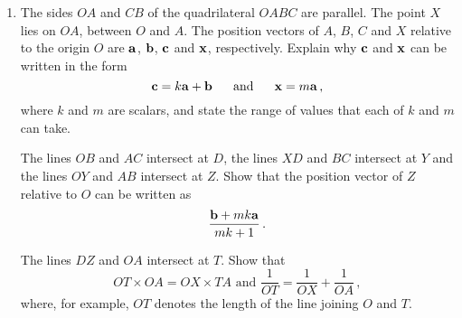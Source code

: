 \documentclass[a4, 11pt]{report}
\newlength{\qspace}
\newcounter{qnumber}
\newenvironment{question}%
 {\vspace{\qspace}
  \begin{enumerate}[\bfseries 1\quad][10]%
    \setcounter{enumi}{\value{qnumber}}%
    \item%
 }
{
  \end{enumerate}
  \filbreak
  \stepcounter{qnumber}
 }
\newenvironment{questionparts}[1][1]%
 {
  \begin{enumerate}[\bfseries (i)]%
    \setcounter{enumii}{#1}
    \addtocounter{enumii}{-1}
    \setlength{\itemsep}{5mm}
    \setlength{\parskip}{8pt}
 }
 {
  \end{enumerate}
 }
\begin{document}
\begin{question}
The sides $OA$ and $CB$ of the quadrilateral $OABC$ are parallel. The point
$X$ lies on $OA$, between $O$ and $A$. The position vectors
of $A$, $B$, $C$ and $X$ relative to the origin $O$ are 
$\bf a$, $\bf b$, $\bf c$ and $\bf x$, respectively.
Explain why  $\bf c$ and $\bf x$ can be written in the form
\[
{\bf c} = k {\bf a} + {\bf b}
\text{ \ \ \ \ and \ \ \ \ }
{\bf x} = m {\bf a}\,,
\]
where $k$ and $m$ are scalars, and  
state the range of values
that each of $k$ and $m$ can take.

The lines $OB$ and $AC$ intersect at $D$, the lines $XD$ and $BC$
intersect at $Y$ and the lines $OY$ and $AB$ intersect at $Z$. Show 
that the position vector of $Z$ relative to $O$ can be written as
\[
\frac{ {\bf b} + mk {\bf a}}{mk+1}\,.
\]

The lines $DZ$ and $OA$ intersect at $T$. Show that 
\[
OT \times OA = OX\times TA
\text{ \ \ \ \ and \ \ \ \ }
\frac 1 {OT} = \frac 1 {OX} + \frac 1 {OA}
\,,
\]
where, for example, $OT$ denotes the length of the line joining
$O$ and $T$.


\end{question}
\end{document}
